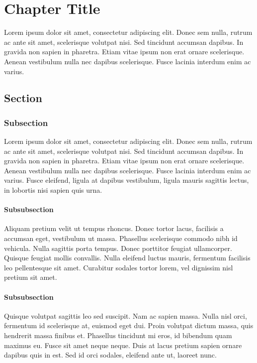 \documentclass[../a5report_tablet.tex]{subfiles}
\begin{document}
\chapter{Chapter Title}
Lorem ipsum dolor sit amet, consectetur adipiscing elit.
Donec sem nulla, rutrum ac ante sit amet, scelerisque volutpat nisi.
Sed tincidunt accumsan dapibus. In gravida non sapien in pharetra. Etiam vitae ipsum non erat ornare scelerisque.
Aenean vestibulum nulla nec dapibus scelerisque. Fusce lacinia interdum enim ac varius.

\section{Section}
\subsection{Subsection}
Lorem ipsum dolor sit amet, consectetur adipiscing elit.
Donec sem nulla, rutrum ac ante sit amet, scelerisque volutpat nisi.
Sed tincidunt accumsan dapibus. In gravida non sapien in pharetra. Etiam vitae ipsum non erat ornare scelerisque.
Aenean vestibulum nulla nec dapibus scelerisque. Fusce lacinia interdum enim ac varius.
Fusce eleifend, ligula at dapibus vestibulum, ligula mauris sagittis lectus, in lobortis nisi sapien quis urna.

\subsubsection{Subsubsection}
Aliquam pretium velit ut tempus rhoncus. Donec tortor lacus, facilisis a accumsan eget, vestibulum
ut massa. Phasellus scelerisque commodo nibh id vehicula. Nulla sagittis porta tempus.
Donec porttitor feugiat ullamcorper. Quisque feugiat mollis convallis. Nulla eleifend luctus mauris,
fermentum facilisis leo pellentesque sit amet. Curabitur sodales tortor lorem,
vel dignissim nisl pretium sit amet.

\subsubsection{Subsubsection}
Quisque volutpat sagittis leo sed suscipit. Nam ac sapien massa. Nulla nisl orci, fermentum id
scelerisque at, euismod eget dui. Proin volutpat dictum massa, quis hendrerit massa finibus et.
Phasellus tincidunt mi eros, id bibendum quam maximus eu. Fusce sit amet neque neque. Duis at lacus
pretium sapien ornare dapibus quis in est. Sed id orci sodales, eleifend ante ut, laoreet nunc.
\end{document}

